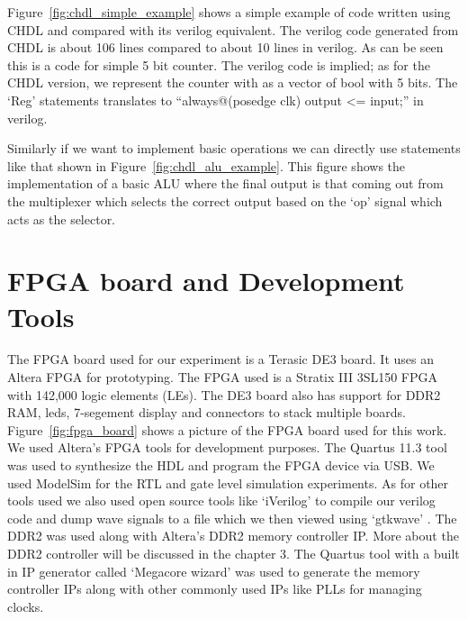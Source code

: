 Figure~\ref{fig:chdl_simple_example} shows a simple example of code written using CHDL and compared with its verilog equivalent. The verilog code generated from CHDL is about 106 lines compared to about 10 lines in verilog. As can be seen this is a code for simple 5 bit counter. The verilog code is implied; as for the CHDL version, we represent the counter with as a vector of bool with 5 bits. The `Reg' statements translates to ``always@(posedge clk) output \textless= input;'' in verilog.


Similarly if we want to implement basic operations we can directly use statements like that shown in Figure~\ref{fig:chdl_alu_example}. This figure shows the implementation of a basic ALU where the final output is that coming out from the multiplexer which selects the correct output based on the  `op' signal which acts as the selector.


\section{FPGA board and Development Tools}
The FPGA board used for our experiment is a Terasic DE3 board. It uses an Altera FPGA for prototyping. The FPGA used is a Stratix III 3SL150 FPGA with 142,000 logic elements (LEs). The DE3 board also has support for DDR2 RAM, leds, 7-segement display and connectors to stack multiple boards. Figure~\ref{fig:fpga_board} shows a picture of the FPGA board used for this work. 
We used Altera's FPGA tools for development purposes. The Quartus 11.3 tool\cite{quartus} was used to synthesize the HDL and program the FPGA device via USB. We used ModelSim for the RTL and gate level simulation experiments. As for other tools used we also used open source tools like `iVerilog'\cite{iverilog} to compile our verilog code and dump wave signals to a file which we then viewed using `gtkwave' \cite{gtkwave}. The DDR2 was used along with Altera's DDR2 memory controller IP. More about the DDR2 controller will be discussed in the chapter 3. The Quartus tool with a built in IP generator called `Megacore wizard' was used to generate the memory controller IPs along with other commonly used IPs like PLLs for managing clocks.

